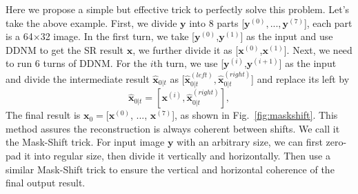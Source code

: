 \documentclass{article} \usepackage{iclr2023_conference,times}
\begin{document}
Here we propose a simple but effective trick to perfectly solve this problem. Let's take the above example. First, we divide $\mathbf{y}$ into 8 parts [$ \mathbf{y}^{(0)}, ..., \mathbf{y}^{(7)}$], each part is a 64$\times$32 image. In the first turn, we take [$\mathbf{y}^{(0)}$,$\mathbf{y}^{(1)}$] as the input and use DDNM to get the SR result $\mathbf{x}$, we further divide it as [$\mathbf{x}^{(0)}$,$\mathbf{x}^{(1)}$]. Next, we need to run 6 turns of DDNM. For the $i$th turn, we use [$\mathbf{y}^{(i)}$,$\mathbf{y}^{(i+1)}$] as the input and divide the intermediate result $\hat{\mathbf{x}}_{0|t}$ as [$\hat{\mathbf{x}}_{0|t}^{(left)},\hat{\mathbf{x}}_{0|t}^{(right)}$] and replace its left by
\begin{equation}
    \hat{\mathbf{x}}_{0|t} = [\mathbf{x}^{(i)},\hat{\mathbf{x}}_{0|t}^{(right)}],
    \label{eq:mask shift}
\end{equation}
The final result is $\mathbf{x}_0=$[$\mathbf{x}^{(0)}$, ..., $\mathbf{x}^{(7)}$], as shown in Fig.~\ref{fig:maskshift}. This method assures the reconstruction is always coherent between shifts. We call it the Mask-Shift trick. For input image $\mathbf{y}$ with an arbitrary size, we can first zero-pad it into regular size, then divide it vertically and horizontally. Then use a similar Mask-Shift trick to ensure the vertical and horizontal coherence of the final output result.







\newpage

\appendix
\end{document}
